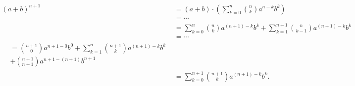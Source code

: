 \documentclass{article}
\begin{document}
\begin{subequations}

\begin{align}
(a+b)^{n+1 } &= (a+b) \cdot \left( \sum_{k=0}^n \binom{n}{k} a^{n-k}b^k \right) \\
\nonumber &= \cdots \\
&= \sum_{k=0}^n \binom{n}{k} a^{(n+1)-k}b^k
+ \sum_{k=1}^{n+1} \binom{n}{k-1} a^{(n+1)-k}b^{k} \\
\nonumber &= \cdots \\
%
\begin{split}
&= \binom{n+1}{0} a^{n+1-0} b^0
+ \sum_{k=1}^n \binom{n+1}{k} a^{(n+1)-k}b^k \\
&+ \binom{n+1}{n+1} a^{n+1-(n+1)} b^{n+1}
\end{split} \\
%
&= \sum_{k=0}^{n+1} \binom{n+1}{k} a^{(n+1)-k}b^k.
\end{align}

\end{subequations}
\end{document}
